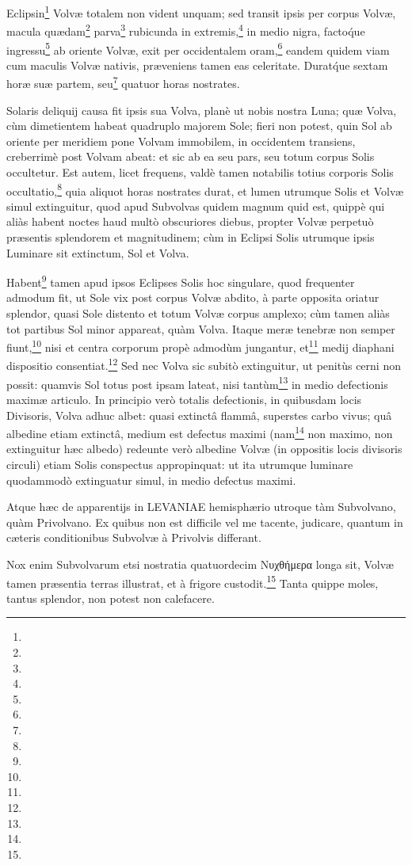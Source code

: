\documentclass[a4paper, 11pt, oneside, polutonikogreek, german]{article}
\begin{document}
Eclipsin\footnote{} Volvæ totalem non vident unquam; sed transit ipsis per corpus Volvæ, macula quædam\footnote{} parva\footnote{} rubicunda in extremis,\footnote{} in medio nigra, facto\'que ingressu\footnote{} ab oriente Volvæ, exit per occidentalem oram,\footnote{} eandem quidem viam cum maculis Volvæ nativis, præveniens tamen eas celeritate. Durat\'que sextam horæ suæ partem, seu\footnote{} quatuor horas nostrates.

Solaris deliquij causa fit ipsis sua Volva, planè ut nobis nostra Luna; quæ Volva, cùm dimetientem habeat quadruplo majorem Sole; fieri non potest, quin Sol ab oriente per meridiem pone Volvam immobilem, in occidentem transiens, creberrimè post Volvam abeat: et sic ab ea seu pars, seu totum corpus Solis occultetur. Est autem, licet frequens, valdè tamen notabilis totius corporis Solis occultatio,\footnote{} quia aliquot horas nostrates durat, et lumen utrumque Solis et Volvæ simul extinguitur, quod apud Subvolvas quidem magnum quid est, quippè qui aliàs habent noctes haud multò obscuriores diebus, propter Volvæ perpetuò præsentis splendorem et magnitudinem; cùm in Eclipsi Solis utrumque ipsis Luminare sit extinctum, Sol et Volva.

Habent\footnote{} tamen apud ipsos Eclipses Solis hoc singulare, quod frequenter admodum fit, ut Sole vix post corpus Volvæ abdito, à parte opposita oriatur splendor, quasi Sole distento et totum Volvæ corpus amplexo; cùm tamen aliàs tot partibus Sol minor appareat, quàm Volva. Itaque meræ tenebræ non semper fiunt,\footnote{} nisi et centra corporum propè admodùm jungantur, et\footnote{} medij diaphani dispositio consentiat.\footnote{} Sed nec Volva sic subitò extinguitur, ut penitùs cerni non possit: quamvis Sol totus post ipsam lateat, nisi tantùm\footnote{} in medio defectionis maximæ articulo. In principio verò totalis defectionis, in quibusdam locis Divisoris, Volva adhuc albet: quasi extinctâ flammâ, superstes carbo vivus; quâ albedine etiam extinctâ, medium est defectus maximi (nam\footnote{} non maximo, non extinguitur hæc albedo) redeunte verò albedine Volvæ (in oppositis locis divisoris circuli) etiam Solis conspectus appropinquat: ut ita utrumque luminare quodammodò extinguatur simul, in medio defectus maximi.

Atque hæc de apparentijs in LEVANIAE hemisphærio utroque tàm Subvolvano, quàm Privolvano. Ex quibus non est difficile vel me tacente, judicare, quantum in cæteris conditionibus Subvolvæ à Privolvis differant.

Nox enim Subvolvarum etsi nostratia quatuordecim Νυχθήμερα longa sit, Volvæ tamen præsentia terras illustrat, et à frigore custodit.\footnote{} Tanta quippe moles, tantus splendor, non potest non calefacere.
\end{document}
